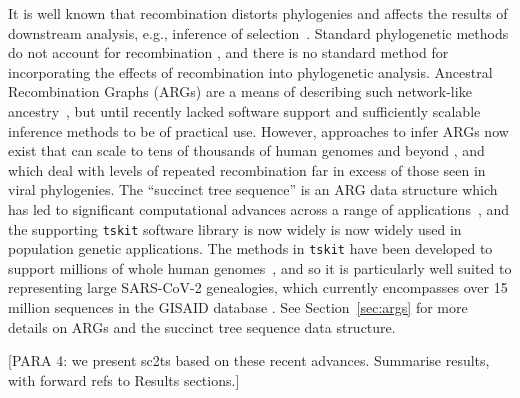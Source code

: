 \documentclass{article}
\begin{document}
It is well known that recombination distorts phylogenies \citep{Schierup2000-fg}
and affects the results of downstream analysis, e.g., inference of
selection~\citep{Anisimova2003-vr}. Standard phylogenetic methods do
not account for recombination
\citep[e.g.][]{Ronquist2012-zw,Minh2020-lr,Guindon2003-zd}, and there is
no standard method for incorporating the effects of recombination into
phylogenetic analysis.
Ancestral Recombination Graphs (ARGs) are a means of describing such
network-like ancestry~\citep{Griffiths1981-lw,Gusfield2014-qw}, but
until recently lacked software support and sufficiently scalable
inference methods to be of practical use.
However, approaches to infer ARGs now exist that can scale to tens of
thousands of human genomes and beyond
\citep{Speidel2019-yh,Kelleher2019-ba,Schaefer2021-yg,Zhang2023-lf}, and which
deal with levels of repeated recombination far in excess of those seen in viral
phylogenies. The ``succinct tree sequence'' is an ARG data structure
which has led to significant computational advances across a range
of
applications~\citep{Kelleher2016-wk,Kelleher2018-xc,Kelleher2019-ba,Ralph2020-efficiently,
Wohns2022-th}, and the supporting \texttt{tskit} software library is now widely
is now widely used in population genetic applications.
The methods in \texttt{tskit} have been developed to support millions of
whole human genomes~\citep{Kelleher2019-ba}, and so it is particularly well suited
to representing large SARS-CoV-2 genealogies,
which currently encompasses over 15 million sequences in the GISAID database
\citep{Shu2017-hp}.
See Section~\ref{sec:args} for more details on ARGs and the succinct
tree sequence data structure.

[PARA 4: we present sc2ts based on these recent advances. Summarise
results, with forward refs to Results sections.]



\end{document}
